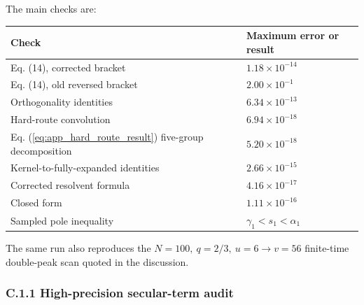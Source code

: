 \documentclass[superscriptaddress, amsmath, amssymb, aps, pre, floatfix]{revtex4-2}
\begin{document}
The main checks are:
\begin{center}
\small
\begin{tabular}{ll}
\hline
Check & Maximum error or result \\
\hline
Eq. (14), corrected bracket & \(1.18\times10^{-14}\) \\
Eq. (14), old reversed bracket & \(2.00\times10^{-1}\) \\
Orthogonality identities & \(6.34\times10^{-13}\) \\
Hard-route convolution & \(6.94\times10^{-18}\) \\
Eq. (\ref{eq:app_hard_route_result}) five-group decomposition & \(5.20\times10^{-18}\) \\
Kernel-to-fully-expanded identities & \(2.66\times10^{-15}\) \\
Corrected resolvent formula & \(4.16\times10^{-17}\) \\
Closed form & \(1.11\times10^{-16}\) \\
Sampled pole inequality & \(\gamma_1<s_1<\alpha_1\) \\
\hline
\end{tabular}
\end{center}
\normalsize
The same run also reproduces the \(N=100,\ q=2/3,\ u=6\to v=56\) finite-time double-peak scan quoted in the discussion.

\subsubsection*{C.1.1 High-precision secular-term audit}
\end{document}
